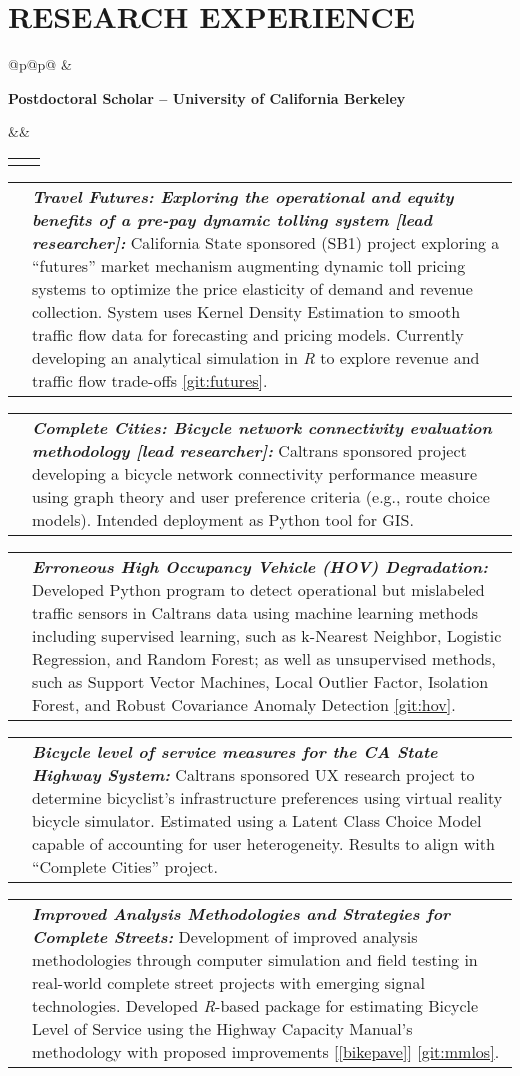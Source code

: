 \documentclass[10pt,letter,sans]{moderncv}
\makeatletter
\renewcommand*{\cvitem}[3][6pt]{%
	\begin{tabular}{@{}p{\hintscolumnwidth}@{\hspace{\separatorcolumnwidth}}p{\maincolumnwidth}@{}}%
		\raggedleft\hintstyle{#2} &{#3}%
	\end{tabular}%
	\par\addvspace{#1}}
\renewcommand*{\cventry}[7][0pt]{%
	\cvitem[#1]{#2}{%
		{\bfseries#3}%
		\ifthenelse{\equal{#4}{}}{}{, {\slshape#4}}%
		\ifthenelse{\equal{#5}{}}{}{, #5}%
		\ifthenelse{\equal{#6}{}}{}{, #6}%
		\strut%
		\ifx&#7&%
		\else{\newline{}\begin{minipage}[t]{\linewidth}\small#7\end{minipage}}\fi}}
\renewcommand*{\cvlistitem}[2][6pt]{%
	\cvitem[#1]{}{\listitemsymbol\begin{minipage}[t]{\listitemcolumnwidth}#2\end{minipage}}}
\let\oldsection\section%
\renewcommand{\section}[1]{\leavevmode\unskip\vspace*{-\baselineskip}\oldsection{#1}}%
\makeatother
\begin{document}
   	\section{RESEARCH EXPERIENCE}
   	\cventry[1pt]{2020-~~~~~~}{Postdoctoral Scholar -- University of California Berkeley}{\hrule}{}{}{}
   	\cvitem[-14pt]{}{}

  	\cvlistitem{\textit{\bfseries Travel Futures: Exploring the operational and equity benefits of a pre-pay dynamic tolling system [lead researcher]:} California State sponsored (SB1) project exploring a ``futures'' market mechanism augmenting dynamic toll pricing systems to optimize the price elasticity of demand and revenue collection. System uses Kernel Density Estimation to smooth traffic flow data for forecasting and pricing models. Currently developing an analytical simulation in \textit{R} to explore revenue and traffic flow trade-offs \ref{git:futures}.}
   	
  	\cvlistitem{\textit{\bfseries Complete Cities: Bicycle network connectivity evaluation methodology [lead researcher]:} Caltrans sponsored project developing a bicycle network connectivity performance measure using graph theory and user preference criteria (e.g., route choice models). Intended deployment as Python tool for GIS.}
  		
	\cvlistitem{\textit{\bfseries Erroneous High Occupancy Vehicle (HOV) Degradation:} Developed Python program to detect operational but mislabeled traffic sensors in Caltrans data using machine learning methods including supervised learning, such as k-Nearest Neighbor, Logistic Regression, and Random Forest; as well as unsupervised methods, such as Support Vector Machines, Local Outlier Factor, Isolation Forest, and Robust Covariance Anomaly Detection \ref{git:hov}.}
	
  	\cvlistitem{\textit{\bfseries Bicycle level of service measures for the CA State Highway System:} Caltrans sponsored UX research project to determine bicyclist's infrastructure preferences using virtual reality bicycle simulator. Estimated using a Latent Class Choice Model capable of accounting for user heterogeneity. Results to align with ``Complete Cities'' project.}
   	
  	\cvlistitem{\textit{\bfseries Improved Analysis Methodologies and Strategies for Complete Streets:} Development of improved analysis methodologies through computer simulation and field testing in real-world complete street projects with emerging signal technologies. Developed \textit{R}-based package for estimating Bicycle Level of Service using the Highway Capacity Manual's methodology with proposed improvements [\ref{bikepave}] \ref{git:mmlos}.}
  	  	   	
\end{document}
